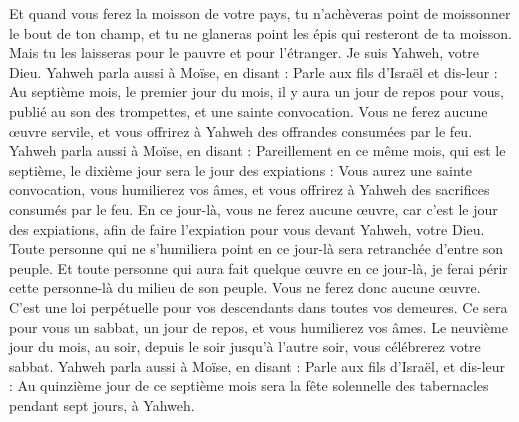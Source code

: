 \begin{multicols}{2}
Et quand vous ferez la moisson de votre pays, tu n'achèveras point de moissonner le bout de ton champ, et tu ne glaneras point les épis qui resteront de ta moisson. Mais tu les laisseras pour le pauvre et pour l'étranger. Je suis Yahweh, votre Dieu.
Yahweh parla aussi à Moïse, en disant :
Parle aux fils d'Israël et dis-leur : Au septième mois, le premier jour du mois, il y aura un jour de repos pour vous, publié au son des trompettes, et une sainte convocation.
Vous ne ferez aucune œuvre servile, et vous offrirez à Yahweh des offrandes consumées par le feu.
Yahweh parla aussi à Moïse, en disant :
Pareillement en ce même mois, qui est le septième, le dixième jour sera le jour des expiations : Vous aurez une sainte convocation, vous humilierez vos âmes, et vous offrirez à Yahweh des sacrifices consumés par le feu.
En ce jour-là, vous ne ferez aucune œuvre, car c'est le jour des expiations, afin de faire l’expiation pour vous devant Yahweh, votre Dieu.
Toute personne qui ne s’humiliera point en ce jour-là sera retranchée d'entre son peuple.
Et toute personne qui aura fait quelque œuvre en ce jour-là, je ferai périr cette personne-là du milieu de son peuple.
Vous ne ferez donc aucune œuvre. C'est une loi perpétuelle pour vos descendants dans toutes vos demeures.
Ce sera pour vous un sabbat, un jour de repos, et vous humilierez vos âmes. Le neuvième jour du mois, au soir, depuis le soir jusqu'à l'autre soir, vous célébrerez votre sabbat.
Yahweh parla aussi à Moïse, en disant :
Parle aux fils d'Israël, et dis-leur : Au quinzième jour de ce septième mois sera la fête solennelle des tabernacles pendant sept jours, à Yahweh.

\end{multicols}
